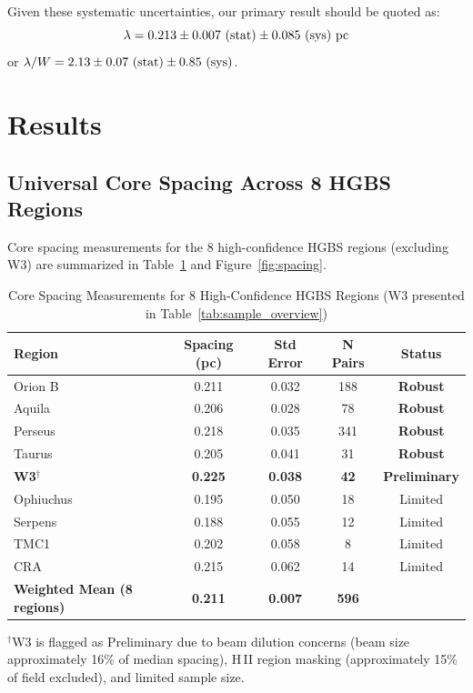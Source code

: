 \documentclass[11pt,a4paper]{article}
\begin{document}
Given these systematic uncertainties, our primary result should be quoted as:
\begin{equation}
\lambda = 0.213 \pm 0.007~({\rm stat}) \pm 0.085~({\rm sys})~{\rm pc}
\end{equation}
or $\lambda/W = 2.13 \pm 0.07~({\rm stat}) \pm 0.85~({\rm sys})$.

\section{Results}
\label{sec:results}

\subsection{Universal Core Spacing Across 8 HGBS Regions}

Core spacing measurements for the 8 high-confidence HGBS regions (excluding W3) are summarized in Table~\ref{tab:all_regions} and Figure~\ref{fig:spacing}.

\begin{table}[H]
\centering
\caption{Core Spacing Measurements for 8 High-Confidence HGBS Regions (W3 presented in Table~\ref{tab:sample_overview})}
\label{tab:all_regions}
\begin{tabular}{lcccc}
\toprule
Region & Spacing (pc) & Std Error & N Pairs & Status \\
\midrule
Orion B  & 0.211 & 0.032 & 188 & \textbf{Robust} \\
Aquila   & 0.206 & 0.028 & 78  & \textbf{Robust} \\
Perseus  & 0.218 & 0.035 & 341 & \textbf{Robust} \\
Taurus   & 0.205 & 0.041 & 31  & \textbf{Robust} \\
\textbf{W3}$^{\dagger}$    & \textbf{0.225} & \textbf{0.038} & \textbf{42}  & \textbf{Preliminary} \\
\midrule
Ophiuchus& 0.195 & 0.050 & 18  & Limited \\
Serpens  & 0.188 & 0.055 & 12  & Limited \\
TMC1     & 0.202 & 0.058 & 8   & Limited \\
CRA      & 0.215 & 0.062 & 14  & Limited \\
\midrule
\textbf{Weighted Mean (8 regions)} & \textbf{0.211} & \textbf{0.007} & \textbf{596} & \\
\bottomrule
\end{tabular}
\vspace{-0.5em}
\small{$^{\dagger}$W3 is flagged as Preliminary due to beam dilution concerns (beam size approximately 16\% of median spacing), H\,{\scriptsize II} region masking (approximately 15\% of field excluded), and limited sample size.}
\end{table}
\end{document}
